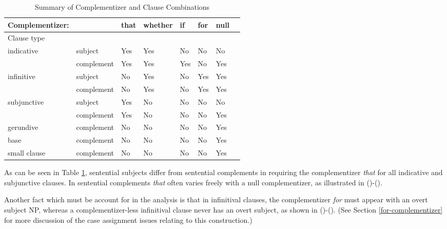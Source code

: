 \begin{table}[h]
\begin{tabular}{l|lllllll}
Complementizer:&&that&whether&if&for&null\\
\hline
Clause type&&&&&&&\\
\hline
indicative&subject&Yes&Yes&No&No&No\\
&complement&Yes&Yes&Yes&No&Yes\\
\hline
infinitive&subject&No&Yes&No&Yes&Yes\\
&complement&No&Yes&No&Yes&Yes\\
\hline
subjunctive&subject&Yes&No&No&No&No\\
&complement&Yes&No&No&No&Yes\\
\hline
gerundive\footnotemark\ &complement&No&No&No&No&Yes\\
\hline
base & complement & No & No & No & No & Yes \\
\hline
small clause & complement & No & No & No & No & Yes \\
\hline
\end{tabular}
\vspace{.2in}
\caption{Summary of Complementizer and Clause Combinations}
\label{facts}
\end{table}

As can be seen in Table \ref{facts}, sentential subjects differ from
sentential complements in requiring the complementizer {\it that\/}
for all indicative and subjunctive clauses.  In sentential complements
{\it that\/} often varies freely with a null complementizer, as
illustrated in ()-().


Another fact which must be account for in the  analysis is that in
infinitival clauses, the complementizer {\it for} must appear with an
overt subject NP, whereas a complementizer-less infinitival clause never
has an overt subject, as shown in ()-(). (See Section
\ref{for-complementizer} for more discussion of the case assignment
issues relating to this construction.)

